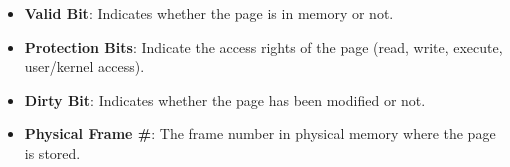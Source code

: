 \begin{itemize}
    \item \textbf{Valid Bit}: Indicates whether the page is in memory or not.
    \item \textbf{Protection Bits}: Indicate the access rights of the page (read, write, execute, user/kernel access).
    \item \textbf{Dirty Bit}: Indicates whether the page has been modified or not.
    \item \textbf{Physical Frame \#}: The frame number in physical memory where the page is stored.
\end{itemize}

